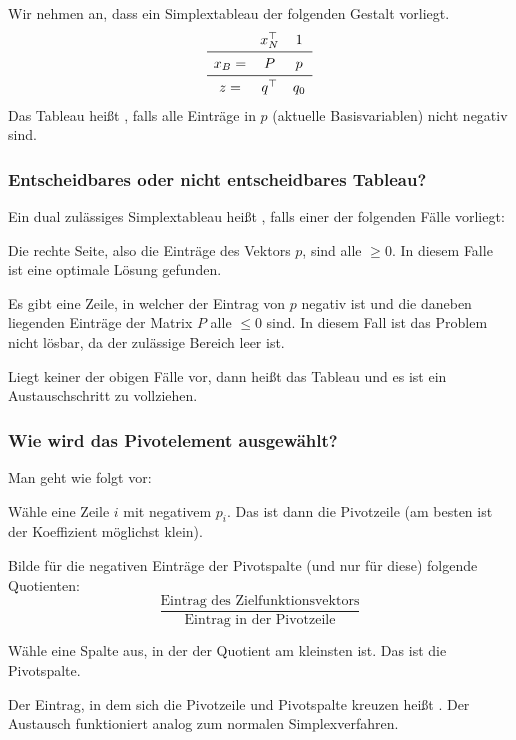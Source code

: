 Wir nehmen an, dass ein Simplextableau der folgenden Gestalt vorliegt.
$$
\begin{matrix}
    & x_N^{\trans} & 1 \\
    \midrule
    x_B = & P & p \\
    \midrule
    z = & q^\trans & q_0 
\end{matrix}
$$
Das Tableau heißt , falls alle Einträge in $p$ (aktuelle Basisvariablen) nicht negativ sind.

\subsubsection{Entscheidbares oder nicht entscheidbares Tableau?}

Ein dual zulässiges Simplextableau heißt , falls einer der folgenden Fälle vorliegt:
\begin{statements}
        \item Die rechte Seite, also die Einträge des Vektors $p$, sind alle $\geq 0$. In diesem Falle ist eine optimale Lösung gefunden.
    \item Es gibt eine Zeile, in welcher der Eintrag von $p$ negativ ist und die daneben liegenden Einträge der Matrix $P$ alle $\leq 0$ sind. In diesem Fall ist das Problem nicht lösbar, da der zulässige Bereich leer ist.
\end{statements}

Liegt keiner der obigen Fälle vor, dann heißt das Tableau  und es ist ein Austauschschritt zu vollziehen.

\subsubsection{Wie wird das Pivotelement ausgewählt?}

Man geht wie folgt vor:

\begin{steps}
        \item Wähle eine Zeile $i$ mit negativem $p_i$. Das ist dann die Pivotzeile (am besten ist der Koeffizient möglichst klein).
        \item Bilde für die negativen Einträge der Pivotspalte (und nur für diese) folgende Quotienten:
    $$
    \frac{\textrm{Eintrag des Zielfunktionsvektors}}{\textrm{Eintrag in der Pivotzeile}}
    $$
    \item Wähle eine Spalte aus, in der der Quotient am kleinsten ist. Das ist die Pivotspalte.
\end{steps}

Der Eintrag, in dem sich die Pivotzeile und Pivotspalte kreuzen heißt .
Der Austausch funktioniert analog zum normalen Simplexverfahren.
